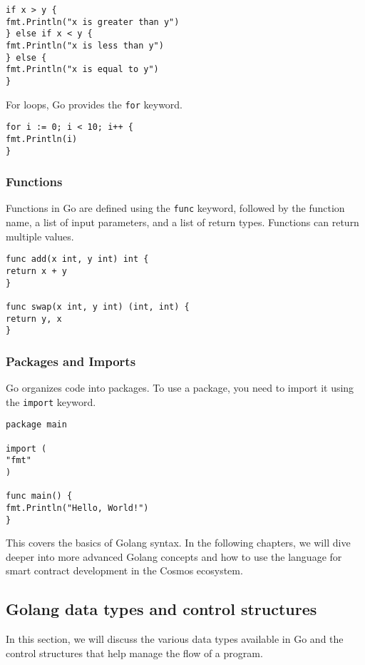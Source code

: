 \documentclass{article}
\begin{document}
\begin{verbatim}
if x > y {
fmt.Println("x is greater than y")
} else if x < y {
fmt.Println("x is less than y")
} else {
fmt.Println("x is equal to y")
}
\end{verbatim}

For loops, Go provides the \texttt{for} keyword.

\begin{verbatim}
for i := 0; i < 10; i++ {
fmt.Println(i)
}
\end{verbatim}

\subsubsection{Functions}

Functions in Go are defined using the \texttt{func} keyword, followed by the function name, a list of input parameters, and a list of return types. Functions can return multiple values.

\begin{verbatim}
func add(x int, y int) int {
return x + y
}

func swap(x int, y int) (int, int) {
return y, x
}
\end{verbatim}

\subsubsection{Packages and Imports}

Go organizes code into packages. To use a package, you need to import it using the \texttt{import} keyword.

\begin{verbatim}
package main

import (
"fmt"
)

func main() {
fmt.Println("Hello, World!")
}
\end{verbatim}

This covers the basics of Golang syntax. In the following chapters, we will dive deeper into more advanced Golang concepts and how to use the language for smart contract development in the Cosmos ecosystem.


\subsection{Golang data types and control structures}


In this section, we will discuss the various data types available in Go and the control structures that help manage the flow of a program.
\end{document}
